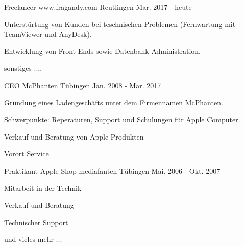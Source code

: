 

\begin{cventries}

  \cventry
    {Freelancer} %
    {www.fragandy.com} %
    {Reutlingen} %
    {Mar. 2017 - heute} %
    {
      \begin{cvitems} %
        \item {Unterstürtung von Kunden bei teschnischen Problemen (Fernwartung mit TeamViewer und AnyDesk).}
        \item {Entwicklung von Front-Ends sowie Datenbank Administration.}
		\item {sonstiges ....}
      \end{cvitems}
    }

  \cventry
    {CEO} %
    {McPhanten} %
    {Tübingen} %
    {Jan. 2008 - Mar. 2017} %
    {
      \begin{cvitems} %
        \item {Gründung eines Ladengeschäfts unter dem Firmennamen McPhanten.}
        \item {Schwerpunkte: Reperaturen, Support und Schulungen für Apple Computer.}
		\item {Verkauf und Beratung von Apple Produkten}
		\item {Vorort Service}
      \end{cvitems}
    }

  \cventry
    {Praktikant} %
    {Apple Shop mediafanten} %
    {Tübingen} %
    {Mai. 2006 - Okt. 2007} %
    {
      \begin{cvitems} %
        \item {Mitarbeit in der Technik}
		\item {Verkauf und Beratung}
		\item {Technischer Support}
		\item {und vieles mehr ...}
	  \end{cvitems}
    }


\end{cventries}

